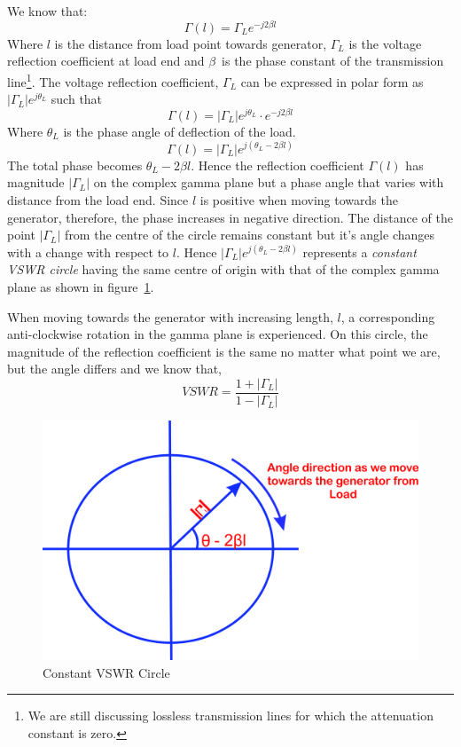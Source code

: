 We know that:
\begin{equation*}
\Gamma(l) =\Gamma_L e^{-j2\beta{l}}
\end{equation*}
Where $l$ is the distance from load point towards generator, $\Gamma_{L}$ is the voltage reflection coefficient at load end and $\beta$\ is the phase constant of the transmission line\footnote{
We are still discussing lossless transmission lines for which the attenuation constant is zero.
}. The  voltage reflection coefficient, $\Gamma_L$ can be expressed in polar form as $|\Gamma_{L}|e^{j\theta_L}$ such that
\begin{equation*}
\Gamma{(l)} = |\Gamma_{L}|e^{j\theta_L}\cdot e^{-j2\beta l}
\end{equation*}
Where $\theta_L$ is the phase angle of deflection of the load.
\begin{equation}
\Gamma{(l)} =|\Gamma_L|e^{j(\theta_L - 2\beta{l})}
\end{equation}
The total phase becomes $\theta_L - 2\beta{l}$. Hence the reflection coefficient $\Gamma{(l)}$ has magnitude $|\Gamma_L|$ on the complex gamma plane but a phase angle that varies with distance from the load end. Since $l$ is positive when moving towards the generator, therefore, the phase increases in negative direction. The distance of the point $|\Gamma_L|$ from the centre of the circle remains constant but it's angle changes with a change with respect to $l$. Hence $|\Gamma_L|e^{j(\theta_L - 2\beta l)}$ represents a \emph{constant VSWR circle} having the same centre of origin with that of the complex gamma plane as shown in figure~\ref{fig:lkjhgryn}.

When moving towards the generator with increasing length, $l$, a corresponding anti-clockwise rotation in the gamma plane is experienced. On this circle, the magnitude of the reflection coefficient is the same no matter what point we are, but the angle differs and we know that,
\begin{equation}
VSWR = \frac{1 + |\Gamma_L|}{1 - |\Gamma_L|}
\end{equation}
\begin{figure}[h]
\centering
\includegraphics[width=0.7\linewidth]{./graphics/lkjhgryn}
\caption{Constant VSWR Circle}
\label{fig:lkjhgryn}
\end{figure}

